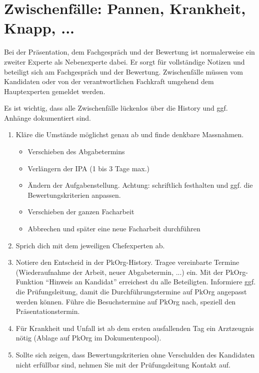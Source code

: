 \chapter{Zwischenfälle: Pannen, Krankheit, Knapp, ...}
Bei der Präsentation, dem Fachgespräch und der Bewertung ist normalerweise ein zweiter Experte als Nebenexperte dabei. Er sorgt für vollständige Notizen und beteiligt sich am Fachgespräch und der Bewertung. Zwischenfälle müssen vom Kandidaten oder von der verantwortlichen Fachkraft umgehend dem Hauptexperten gemeldet werden.

Es ist wichtig, dass alle Zwischenfälle lückenlos über die History und ggf. Anhänge dokumentiert sind.

\begin{enumerate}
  \item Kläre die Umstände möglichst genau ab und finde denkbare Massnahmen.
  \begin{itemize}
    \item Verschieben des Abgabetermins
    \item Verlängern der IPA (1 bis 3 Tage max.)
    \item Ändern der Aufgabenstellung. Achtung: schriftlich festhalten und ggf. die Bewertungskriterien anpassen.
    \item Verschieben der ganzen Facharbeit
    \item Abbrechen und später eine neue Facharbeit durchführen
  \end{itemize}
  \item Sprich dich mit dem jeweiligen Chefexperten ab.
  \item Notiere den Entscheid in der PkOrg-History. Tragee vereinbarte Termine (Wiederaufnahme der Arbeit, neuer Abgabetermin, ...) ein. Mit der PkOrg-Funktion \enquote{Hinweis an Kandidat} erreichest du alle Beteiligten.
  Informiere ggf. die Prüfungsleitung, damit die Durchführungstermine auf PkOrg
  angepasst werden können. Führe die Besuchstermine auf PkOrg nach, speziell den Präsentationstermin.
  \item Für Krankheit und Unfall ist ab dem ersten ausfallenden Tag ein Arztzeugnis nötig (Ablage auf PkOrg im Dokumentenpool).
  \item Sollte sich zeigen, dass Bewertungskriterien ohne Verschulden des Kandidaten nicht erfüllbar sind, nehmen Sie mit der Prüfungsleitung Kontakt auf.
\end{enumerate}

